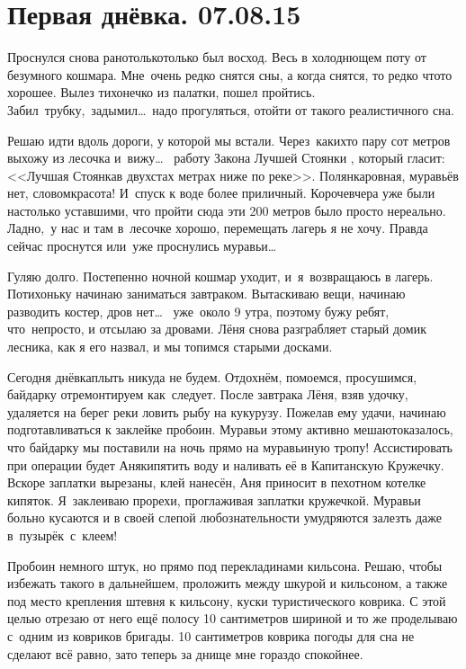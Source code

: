 \chapter{Первая днёвка. 07.08.15}

Проснулся снова рано\mdash только\sdash только был восход. Весь в холоднющем поту от безумного кошмара. Мне~очень редко снятся сны, а когда снятся, то редко что\sdash то хорошее. Вылез тихонечко из палатки, пошел пройтись. Забил~трубку,~задымил\ldots ~надо прогуляться, отойти от такого реалистичного сна.

Решаю идти вдоль дороги, у которой мы встали. Через~каких\sdash то пару сот метров выхожу из лесочка и~вижу\ldots~ работу Закона Лучшей Стоянки \cite{Квадригин}, который гласит: <<Лучшая Стоянка\mdash в двухстах метрах ниже по реке>>. Полянка\mdash ровная, муравьёв нет, словом\mdash красота! И~спуск к воде более приличный. Короче\mdash вчера уже были настолько уставшими, что пройти сюда эти 200 метров было просто нереально. Ладно,~у нас и там в~лесочке хорошо, перемещать лагерь я не хочу. Правда сейчас проснутся или~уже проснулись муравьи\ldots~

Гуляю долго. Постепенно ночной кошмар уходит, и~я~возвращаюсь в лагерь. Потихоньку начинаю заниматься завтраком. Вытаскиваю вещи, начинаю разводить костер, дров нет\ldots~ уже~около 9 утра, поэтому бужу ребят, что~непросто, и отсылаю за дровами. Лёня снова разграбляет старый домик лесника, как я его назвал, и мы топимся старыми досками. 

Сегодня днёвка\mdash плыть никуда не будем. Отдохнём, помоемся, просушимся, байдарку отремонтируем как~следует. После завтрака Лёня, взяв удочку, удаляется на берег реки ловить рыбу на кукурузу. Пожелав ему удачи, начинаю подготавливаться к заклейке пробоин. Муравьи этому активно мешают\mdash оказалось, что байдарку мы поставили на ночь прямо на муравьиную тропу! Ассистировать при операции будет Аня\mdash кипятить воду и наливать её в Капитанскую Кружечку. Вскоре заплатки вырезаны, клей нанесён, Аня приносит в пехотном котелке кипяток. Я~заклеиваю прорехи, проглаживая заплатки кружечкой. Муравьи больно кусаются и в своей слепой любознательности умудряются залезть даже в~пузырёк~с~клеем! 

Пробоин немного штук, но прямо под перекладинами кильсона. Решаю, чтобы избежать такого в дальнейшем, проложить между шкурой и кильсоном, а также под место крепления штевня к кильсону, куски туристического коврика. С этой целью отрезаю от него ещё полосу 10 сантиметров шириной и то же проделываю с~одним из ковриков бригады. 10 сантиметров коврика погоды для сна не сделают всё равно, зато теперь за днище мне гораздо спокойнее. 


